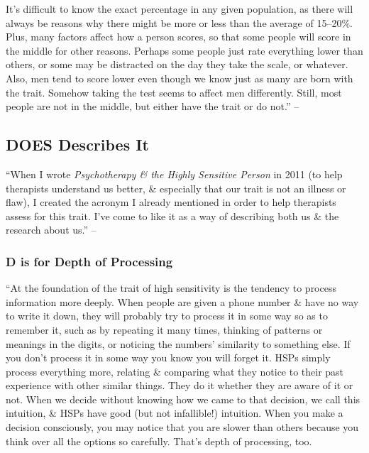 \documentclass{article}
\numberwithin{equation}{section}
\begin{document}
It's difficult to know the exact percentage in any given population, as there will always be reasons why there might be more or less than the average of 15--20\%. Plus, many factors affect how a person scores, so that some people will score in the middle for other reasons. Perhaps some people just rate everything lower than others, or some may be distracted on the day they take the scale, or whatever. Also, men tend to score lower even though we know just as many are born with the trait. Somehow taking the test seems to affect men differently. Still, most people are not in the middle, but either have the trait or do not.'' -- \cite[pp. 17--18]{Aron2013}

\subsection*{DOES Describes It}
``When I wrote \textit{Psychotherapy \& the Highly Sensitive Person} in 2011 (to help therapists understand us better, \& especially that our trait is not an illness or flaw), I created the acronym I already mentioned in order to help therapists assess for this trait. I've come to like it as a way of describing both us \& the research about us.'' -- \cite[p. 18]{Aron2013}

\subsubsection*{D is for Depth of Processing}
``At the foundation of the trait of high sensitivity is the tendency to process information more deeply. When people are given a phone number \& have no way to write it down, they will probably try to process it in some way so as to remember it, such as by repeating it many times, thinking of patterns or meanings in the digits, or noticing the numbers' similarity to something else. If you don't process it in some way you know you will forget it. HSPs simply process everything more, relating \& comparing what they notice to their past experience with other similar things. They do it whether they are aware of it or not. When we decide without knowing how we came to that decision, we call this intuition, \& HSPs have good (but not infallible!) intuition. When you make a decision consciously, you may notice that you are slower than others because you think over all the options so carefully. That's depth of processing, too.
\end{document}
